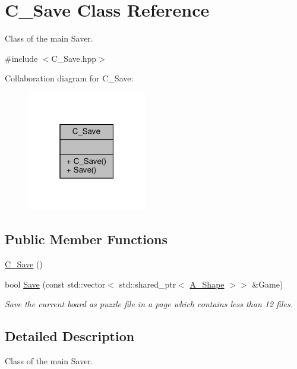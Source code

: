 \hypertarget{classC__Save}{}\section{C\+\_\+\+Save Class Reference}
\label{classC__Save}


Class of the main Saver.  




{\ttfamily \#include $<$C\+\_\+\+Save.\+hpp$>$}



Collaboration diagram for C\+\_\+\+Save\+:
\nopagebreak
\begin{figure}[H]
\begin{center}
\leavevmode
\includegraphics[width=147pt]{classC__Save__coll__graph}
\end{center}
\end{figure}
\subsection*{Public Member Functions}
\begin{DoxyCompactItemize}
\item 
\hyperlink{classC__Save_adc49f753d7b0f40c95ec2b93f81b9672}{C\+\_\+\+Save} ()
\item 
bool \hyperlink{classC__Save_a144be848679b771afb9cf410710308e8}{Save} (const std\+::vector$<$ std\+::shared\+\_\+ptr$<$ \hyperlink{classA__Shape}{A\+\_\+\+Shape} $>$$>$ \&Game)
\begin{DoxyCompactList}\small\item\em Save the current board as puzzle file in a page which contains less than 12 files. \end{DoxyCompactList}\end{DoxyCompactItemize}


\subsection{Detailed Description}
Class of the main Saver. 

